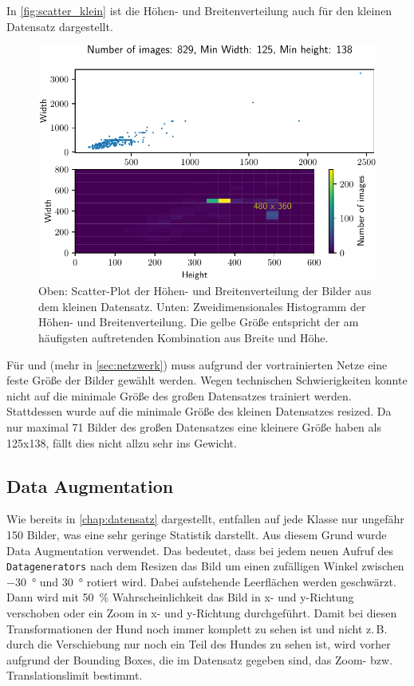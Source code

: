 In \autoref{fig:scatter_klein} ist die Höhen- und Breitenverteilung auch für
den kleinen Datensatz dargestellt.

\begin{figure}
  \centering
  \includegraphics[scale=0.9]{pics/width_height_scatter_hist2d_klein.pdf}
  \caption{Oben: Scatter-Plot der Höhen- und Breitenverteilung der Bilder aus
  dem kleinen Datensatz.
  Unten: Zweidimensionales Histogramm der Höhen- und Breitenverteilung.
  Die gelbe Größe entspricht der am häufigsten auftretenden Kombination
  aus Breite und Höhe.}
  \label{fig:scatter_klein}
\end{figure}

Für \PreDog{} und \PreBig{} (mehr in \autoref{sec:netzwerk}) muss aufgrund der
vortrainierten Netze eine feste Größe der Bilder gewählt werden. Wegen
technischen Schwierigkeiten konnte nicht auf die minimale Größe des großen
Datensatzes trainiert  werden. Stattdessen wurde auf die minimale Größe des
kleinen Datensatzes resized. Da nur maximal 71 Bilder des großen Datensatzes
eine kleinere Größe haben als 125x138, fällt dies nicht allzu sehr ins Gewicht.

\subsection{Data Augmentation}
Wie bereits in \autoref{chap:datensatz} dargestellt, entfallen auf jede Klasse
nur ungefähr 150 Bilder, was eine sehr geringe Statistik darstellt. Aus diesem
Grund wurde Data Augmentation verwendet. Das bedeutet, dass bei jedem neuen
Aufruf des \texttt{Datagenerators} nach dem Resizen das Bild um einen zufälligen
Winkel zwischen \SI{-30}{\degree} und \SI{30}{\degree} rotiert wird. Dabei
aufstehende Leerflächen werden geschwärzt. Dann wird mit \SI{50}{\percent}
Wahrscheinlichkeit das Bild in x- und y-Richtung verschoben oder ein Zoom in x-
und y-Richtung durchgeführt. Damit bei diesen Transformationen der Hund noch
immer komplett zu sehen ist und nicht z.\,B. durch die Verschiebung nur noch ein
Teil des Hundes zu sehen ist, wird vorher aufgrund der Bounding Boxes, die im
Datensatz gegeben sind, das Zoom- bzw. Translationslimit bestimmt.

